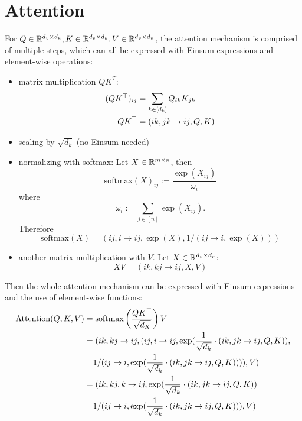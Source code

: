 \section{Attention}
For $Q \in \mathbb{R}^{d_v \times d_k}, K \in \mathbb{R}^{d_v \times d_k}, V \in \mathbb{R}^{d_v \times d_v}$, the attention mechanism is comprised of multiple steps, which can all be expressed with Einsum expressions and element-wise operations:
\begin{itemize}
    \item matrix multiplication $Q K^T$:
          \begin{align*}
              (QK^\top)_{ij} & = \sum\limits_{k \in [d_k]} Q_{ik} K_{jk} \\
              QK^\top        & = (ik, jk \rightarrow ij, Q, K)
          \end{align*}
    \item scaling by $\sqrt{d_k}$ (no Einsum needed)
    \item normalizing with softmax: Let $X \in \mathbb{R}^{m \times n}$, then
          $$\text{softmax}(X)_{ij} := \frac{\exp(X_{ij})}{\omega_i}$$
          where
          $$\omega_i := \sum\limits_{j \in [n]} \exp(X_{ij}).$$
          Therefore
          $$\text{softmax}(X) = (ij, i \rightarrow ij, \exp(X), 1 / (ij \rightarrow i, \exp(X)))$$
    \item another matrix multiplication with $V$. Let $X \in \mathbb{R}^{d_v \times d_v}$:
          $$X V = (ik, kj \rightarrow ij, X, V)$$
\end{itemize}

Then the whole attention mechanism can be expressed with Einsum expressions and the use of element-wise functions:
\begin{align*}
    \text{Attention}(Q, K, V) & = \text{softmax}\left(\frac{Q K^\T}{\sqrt{d_K}}\right)V                                                          \\
                              & = (ik, kj \rightarrow ij, (ij, i \rightarrow ij, \exp(\frac{1}{\sqrt{d_k}} \cdot (ik, jk \rightarrow ij, Q, K)), \\
                              & \phantom{{}=} 1 / (ij \rightarrow i, \exp(\frac{1}{\sqrt{d_k}} \cdot (ik, jk \rightarrow ij, Q, K)))), V)        \\
                              & = (ik, kj, k \rightarrow ij, \exp(\frac{1}{\sqrt{d_k}} \cdot (ik, jk \rightarrow ij, Q, K))                      \\
                              & \phantom{{}=} 1 / (ij \rightarrow i, \exp(\frac{1}{\sqrt{d_k}} \cdot (ik, jk \rightarrow ij, Q, K))), V)
\end{align*}
